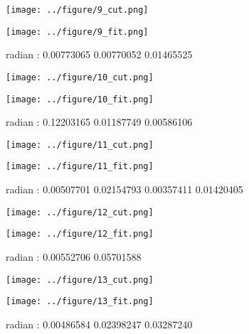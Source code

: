 \documentclass{article}
\begin{document}
 \begin{figure}[H]
\begin{minipage}{0.48\linewidth}
  \centerline{\texttt{[image: ../figure/9\_cut.png]}}
\end{minipage}
\hfill
\begin{minipage}{0.48\linewidth}
  \centerline{\texttt{[image: ../figure/9\_fit.png]}}
\end{minipage}
\caption{radian : 0.00773065 0.00770052 0.01465525}
\end{figure}

 \begin{figure}[H]
\begin{minipage}{0.48\linewidth}
  \centerline{\texttt{[image: ../figure/10\_cut.png]}}
\end{minipage}
\hfill
\begin{minipage}{0.48\linewidth}
  \centerline{\texttt{[image: ../figure/10\_fit.png]}}
\end{minipage}
\caption{radian : 0.12203165 0.01187749 0.00586106}
\end{figure}

 \begin{figure}[H]
\begin{minipage}{0.48\linewidth}
  \centerline{\texttt{[image: ../figure/11\_cut.png]}}
\end{minipage}
\hfill
\begin{minipage}{0.48\linewidth}
  \centerline{\texttt{[image: ../figure/11\_fit.png]}}
\end{minipage}
\caption{radian : 0.00507701 0.02154793 0.00357411 0.01420405}
\end{figure}

 \begin{figure}[H]
\begin{minipage}{0.48\linewidth}
  \centerline{\texttt{[image: ../figure/12\_cut.png]}}
\end{minipage}
\hfill
\begin{minipage}{0.48\linewidth}
  \centerline{\texttt{[image: ../figure/12\_fit.png]}}
\end{minipage}
\caption{radian : 0.00552706 0.05701588}
\end{figure}


 \begin{figure}[H]
\begin{minipage}{0.48\linewidth}
  \centerline{\texttt{[image: ../figure/13\_cut.png]}}
\end{minipage}
\hfill
\begin{minipage}{0.48\linewidth}
  \centerline{\texttt{[image: ../figure/13\_fit.png]}}
\end{minipage}
\caption{radian : 0.00486584 0.02398247 0.03287240}
\end{figure}
\end{document}

